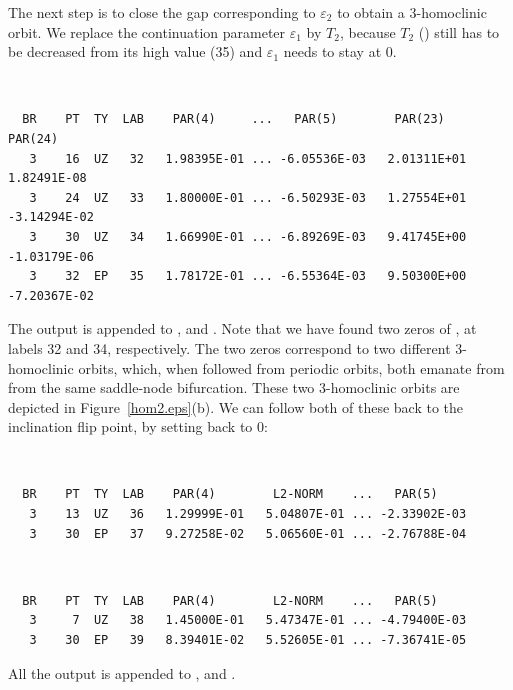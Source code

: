 \documentclass[12pt]{report}
\begin{document}
The next step is to close the gap corresponding to $\varepsilon_2$ to
obtain a 3-homoclinic orbit. We replace the continuation parameter
$\varepsilon_1$ by $T_2$, because $T_2$ ()
still has to be decreased from
its high value (35) and $\varepsilon_1$ needs to stay at 0.
\begin{center}
 \\
\end{center} 
\begin{verbatim}
  BR    PT  TY  LAB    PAR(4)     ...   PAR(5)        PAR(23)       PAR(24)
   3    16  UZ   32   1.98395E-01 ... -6.05536E-03   2.01311E+01   1.82491E-08
   3    24  UZ   33   1.80000E-01 ... -6.50293E-03   1.27554E+01  -3.14294E-02
   3    30  UZ   34   1.66990E-01 ... -6.89269E-03   9.41745E+00  -1.03179E-06
   3    32  EP   35   1.78172E-01 ... -6.55364E-03   9.50300E+00  -7.20367E-02
\end{verbatim}
The output is appended to ,   and .
Note that we have found two zeros of , at labels 32 and
34, respectively. The two zeros
correspond to two different 3-homoclinic
orbits, which, when followed from periodic orbits, both emanate from
from the same saddle-node bifurcation.
These two 3-homoclinic orbits are depicted in Figure~\ref{hom2.eps}(b).
We can follow both of these back to the inclination flip point, by
setting  back to 0:
\begin{center}
 \\
\end{center} 
\begin{verbatim}
  BR    PT  TY  LAB    PAR(4)        L2-NORM    ...   PAR(5)     
   3    13  UZ   36   1.29999E-01   5.04807E-01 ... -2.33902E-03
   3    30  EP   37   9.27258E-02   5.06560E-01 ... -2.76788E-04
\end{verbatim}
\begin{center}
 \\
\end{center}
\begin{verbatim}
  BR    PT  TY  LAB    PAR(4)        L2-NORM    ...   PAR(5)     
   3     7  UZ   38   1.45000E-01   5.47347E-01 ... -4.79400E-03
   3    30  EP   39   8.39401E-02   5.52605E-01 ... -7.36741E-05
\end{verbatim}
All the output is appended to ,   and .
\end{document}
